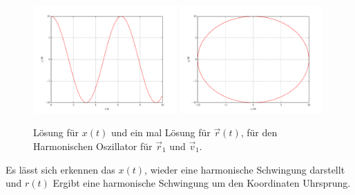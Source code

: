 \begin{figure}
	\centering
	\includegraphics[width = 0.49\textwidth]{../Plots/Plot_2_A_3}
		\includegraphics[width = 0.49\textwidth]{../Plots/Plot_2_A_2}
		\caption{Lösung für $x(t)$ und ein mal Lösung für $\vec{r}(t)$, für den Harmonischen Oszillator für $\vec{r}_1$ und $\vec{v}_1$. }
\end{figure}
Es lässt sich erkennen das $x(t)$, wieder eine harmonische Schwingung darstellt und $r(t)$ Ergibt eine harmonische Schwingung um den Koordinaten Uhrsprung.
\newpage
